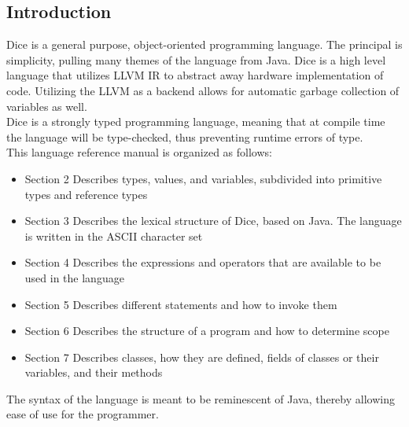 \begin{homeworkProblem}
	\section{Introduction}
	Dice is a general purpose, object-oriented programming language. The principal is simplicity, pulling many themes of the language from Java. Dice is a high level language that utilizes LLVM IR to abstract away hardware implementation of code. Utilizing the LLVM as a backend allows for automatic garbage collection of variables as well. \\
	Dice is a strongly typed programming language, meaning that at compile time the language will be type-checked, thus preventing runtime errors of type. \\
	This language reference manual is organized as follows:\\
	\begin{itemize}
		\item Section 2 Describes types, values, and variables, subdivided into primitive types and reference types
		\item Section 3 Describes the lexical structure of Dice, based on Java. The language is written in the ASCII character set
		\item Section 4 Describes the expressions and operators that are available to be used in the language
		\item Section 5 Describes different statements and how to invoke them
		\item Section 6 Describes the structure of a program and how to determine scope
		\item Section 7 Describes classes, how they are defined, fields of classes or their variables, and their methods
	\end{itemize}
	The syntax of the language is meant to be reminescent of Java, thereby allowing ease of use for the programmer. 
\end{homeworkProblem}
